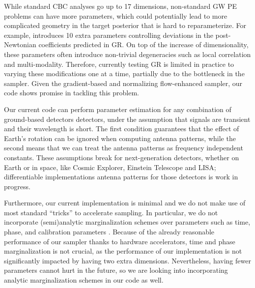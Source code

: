 \documentclass[twocolumn]{aastex631}
\begin{document}
While standard CBC analyses go up to 17 dimensions, non-standard GW PE problems
can have more parameters, which could potentially lead to more complicated
geometry in the target posterior that is hard to reparameterize. For example,
\cite{LIGOScientific:2021sio} introduces 10 extra parameters controlling
deviations in the post-Newtonian coefficients predicted in GR. On top of the
increase of dimensionality, these parameters often introduce non-trivial
degeneracies such as local correlation and multi-modality. Therefore, currently
testing GR is limited in practice to varying these modifications one at a time,
partially due to the bottleneck in the sampler.  Given the gradient-based and
normalizing flow-enhanced sampler, our code shows promise in tackling this
problem.

Our current code can perform parameter estimation for any combination of
ground-based detectors detectors, under the assumption that signals are
transient and their wavelength is short. The first condition guarantees that
the effect of Earth's rotation can be ignored when computing antenna patterns,
while the second means that we can treat the antenna patterns as frequency
independent constants. These assumptions break for next-generation detectors,
whether on Earth or in space, like Cosmic Explorer, Einstein Telescope and
LISA; differentiable implementations antenna patterns for those detectors is
work in progress.

Furthermore, our current implementation is minimal and we do not make use of
most standard ``tricks'' to accelerate sampling.  In particular, we do not
incorporate (semi)analytic marginalization schemes over parameters such as
time, phase, and calibration parameters \cite{2019PASA...36...10T}. Because of
the already reasonable performance of our sampler thanks to hardware
accelerators, time and phase marginalization is not crucial, as the performance
of our implementation is not significantly impacted by having two extra
dimensions. Nevertheless, having fewer parameters cannot hurt in the future, so
we are looking into incorporating analytic marginalization schemes in our code
as well.
\end{document}
